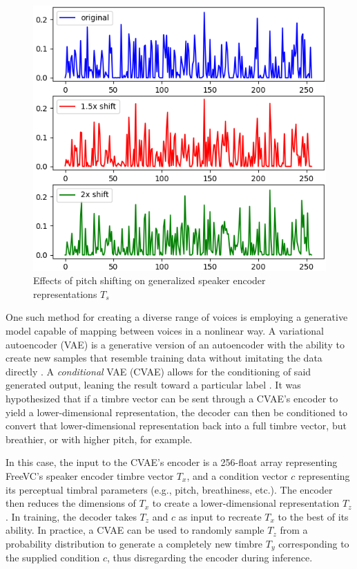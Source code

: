 \documentclass{article}
\begin{document}
\begin{figure}
    \centering
    \includegraphics[width=0.9\linewidth]{spk-shift.png}
    \caption{Effects of pitch shifting on generalized speaker encoder representations $T_s$}
    \label{fig:spk-shift}
\end{figure}

One such method for creating a diverse range of voices is employing a generative model capable of mapping between voices in a nonlinear way. A variational autoencoder (VAE) is a generative version of an autoencoder with the ability to create new samples that resemble training data without imitating the data directly \cite{kingma2013}. A \textit{conditional} VAE (CVAE) allows for the conditioning of said generated output, leaning the result toward a particular label \cite{sohn2015}. It was hypothesized that if a timbre vector can be sent through a CVAE's encoder to yield a lower-dimensional representation, the decoder can then be conditioned to convert that lower-dimensional representation back into a full timbre vector, but breathier, or with higher pitch, for example.

In this case, the input to the CVAE's encoder is a 256-float array representing FreeVC's speaker encoder timbre vector $T_x$, and a condition vector $c$ representing its perceptual timbral parameters (e.g., pitch, breathiness, etc.). The encoder then reduces the dimensions of $T_x$ to create a lower-dimensional representation $T_z$. In training, the decoder takes $T_z$ and $c$ as input to recreate $T_x$ to the best of its ability. In practice, a CVAE can be used to randomly sample $T_z$ from a probability distribution to generate a completely new timbre $T_y$ corresponding to the supplied condition $c$, thus disregarding the encoder during inference.
\end{document}
